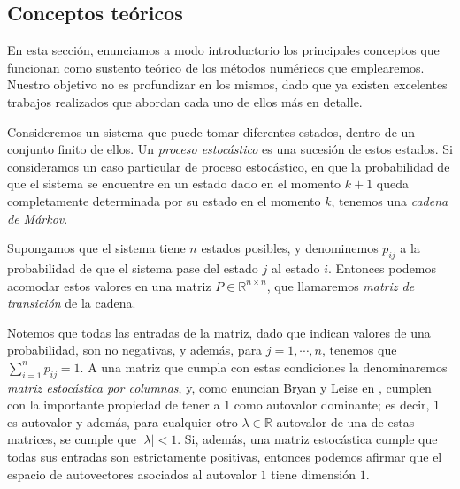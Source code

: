         \subsection{Conceptos teóricos}

        En esta sección, enunciamos a modo introductorio los principales conceptos que funcionan como sustento teórico de los métodos numéricos que emplearemos. Nuestro objetivo no es profundizar en los mismos, dado que ya existen excelentes trabajos realizados que abordan cada uno de ellos más en detalle.

        Consideremos un sistema que puede tomar diferentes estados, dentro de un conjunto finito de ellos. Un \emph{proceso estocástico} es una sucesión de estos estados. Si consideramos un caso particular de proceso estocástico, en que la probabilidad de que el sistema se encuentre en un estado dado en el momento $k+1$ queda completamente determinada por su estado en el momento $k$, tenemos una \emph{cadena de Márkov}.

        Supongamos que el sistema tiene $n$ estados posibles, y denominemos $p_{ij}$ a la probabilidad de que el sistema pase del estado $j$ al estado $i$. Entonces podemos acomodar estos valores en una matriz $P \in \mathbb{R}^{n \times n}$, que llamaremos \emph{matriz de transición} de la cadena.

        Notemos que todas las entradas de la matriz, dado que indican valores de una probabilidad, son no negativas, y además, para $j = 1, \cdots, n$, tenemos que $\sum_{i=1}^{n} p_{ij} = 1$. A una matriz que cumpla con estas condiciones la denominaremos \emph{matriz estocástica por columnas}, y, como enuncian Bryan y Leise en \cite{Bryan2006}, cumplen con la importante propiedad de tener a $1$ como autovalor dominante; es decir, $1$ es autovalor y además, para cualquier otro $\lambda \in \mathbb{R}$ autovalor de una de estas matrices, se cumple que $|\lambda| < 1$. Si, además, una matriz estocástica cumple que todas sus entradas son estrictamente positivas, entonces podemos afirmar que el espacio de autovectores asociados al autovalor $1$ tiene dimensión $1$.

